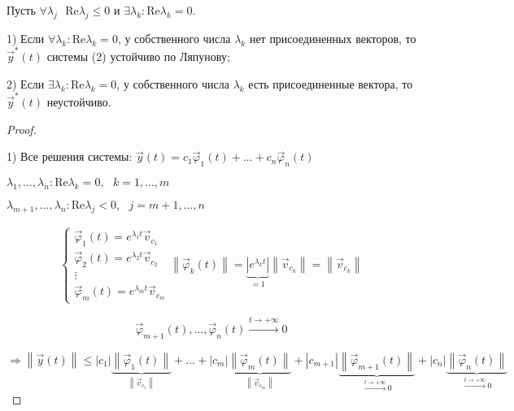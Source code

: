 \documentclass[12pt, a4paper]{report}
\begin{document}
\begin{theorem}
    Пусть \( \forall  \lambda_j \text{ }  \mathrm{ Re }  \lambda_j \le  0   \) и \( \exists  \lambda_k : \mathrm{Re }  \lambda_k = 0  \). 

    1) Если \( \forall  \lambda_k : \mathrm{ Re } \lambda_k  = 0  \), у собственного числа \( \lambda_k \) нет присоединенных векторов, то \( \vec{y } ^* (t ) \) системы (2) устойчиво по Ляпунову; 

    2) Если \( \exists  \lambda_k : \mathrm{Re }  \lambda_k  =0   \), у собственного числа \( \lambda_k  \) есть присоединенные вектора, то \( \vec{y} ^{* } (t ) \) неустойчиво.
\end{theorem}

\begin{proof} \(  \) 

    1) Все решения системы: \( \vec{y } (t ) = c_1 \vec{\varphi }_1 (t )+...+ c_n \vec{\varphi }_n (t)   \) 

    \( \lambda_1, \ldots, \lambda_n : \mathrm{Re }  \lambda_k = 0  , \text{ }  k= 1, \ldots, m  \) 

    \( \lambda_{m+1 },..., \lambda_n : \mathrm{Re }  \lambda_j < 0 ,\text{ }  j = m+1 ,..., n   \) 

    \[ \begin{aligned}
        \begin{cases}
            \vec{\varphi }_1 (t ) = e^{ \lambda_1 t } \vec{v } _{c_1 }  \\
            \vec{\varphi }_2 (t ) = e^{ \lambda_2 t } \vec{ v }  _{c_2}  \\
            \vdots \\ 
            \vec{\varphi }_m (t ) = e^{ \lambda_m t } \vec{v }_{c_m }   
        \end{cases} 
        \left\lVert \vec{\varphi }_k (t)  \right\rVert = \underbrace{\left\lvert e^{\lambda_k t }  \right\rvert}_{=1} \left\lVert \vec{v } _{c_k }  \right\rVert = \left\lVert \vec{v }  _{c_k }  \right\rVert 
    \end{aligned}\] 

    \[ \vec{\varphi}  _{m+1 } (t ) ,..., \vec{\varphi } _n(t ) \xrightarrow{t \to  +\infty } 0    \] 

    \[ \Rightarrow \left\lVert \vec{y } (t ) \right\rVert \le  \left\lvert  c_1  \right\rvert \underbrace{\left\lVert  \vec{\varphi }_1 (t)  \right\rVert}_{\left\lVert \vec{v } _{c_1}  \right\rVert} +...+ \left\lvert c_m \right\rvert \underbrace{\left\lVert \vec{\varphi }_m(t)  \right\rVert}_{\left\lVert \vec{v } _{c_m}  \right\rVert} + \left\lvert c_{m+1 }    \right\rvert \underbrace{\left\lVert  \vec{\varphi }_{m+1 } (t )  \right\rVert}_{\xrightarrow{t \to  + \infty } 0} + \left\lvert c_n \right\rvert \underbrace{\left\lVert  \vec{\varphi }_n (t )  \right\rVert}_{\xrightarrow{t \to  + \infty } 0  } \] 


\end{proof}
\end{document}
